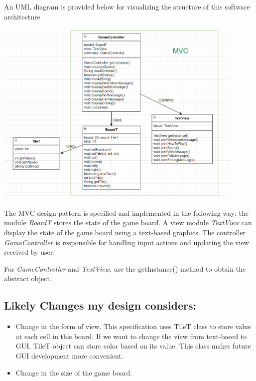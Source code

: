 \documentclass[12pt]{article}
\begin{document}
\bigskip

\noindent An UML diagram is provided below for visualizing the structure of this software architecture

\includegraphics[width=0.9\textwidth]{A4_UML.png}

\medskip
The MVC design pattern is specified and implemented in the following way: the module \textit{BoardT} stores the state of the game board. A view module \textit{TextView} can display the state of the game board using a text-based graphics. The controller \textit{GameController} is responsible for handling input actions and updating the view received by user. 

\medskip

For \textit{GameController} and \textit{TextView}, use the getInstance() method to obtain the abstract object.

\newpage

\subsection*{Likely Changes my design considers:}

\begin{itemize}
  \item Change in the form of view. This specification uses TileT class to store value at each cell in this board. If we want to change the view from text-based to GUI, TileT object can store color based on its value. This class makes future GUI development more convenient.
  \item Change in the size of the game board. 
\end{itemize}
\end{document}

